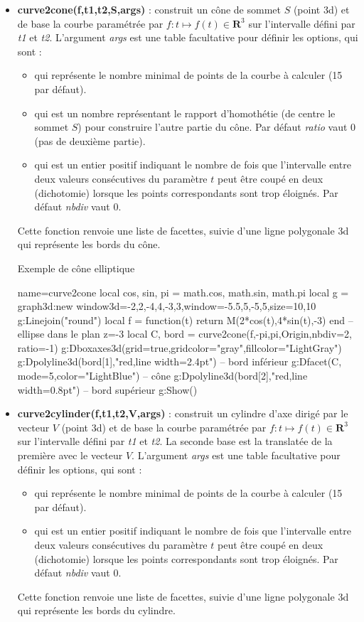 \begin{itemize}
    \item \textbf{curve2cone(f,t1,t2,S,args)} : construit un cône de sommet $S$ (point 3d) et de base la courbe paramétrée par $f\colon t\mapsto f(t)\in\mathbf R^3$ sur l'intervalle défini par \emph{t1} et \emph{t2}. L'argument \emph{args} est une table facultative pour définir les options, qui sont :
    \begin{itemize}
        \item {} qui représente le nombre minimal de points de la courbe à calculer (15 par défaut).
        \item {} qui est un nombre représentant le rapport d'homothétie (de centre le sommet $S$) pour construire l'autre partie du cône. Par défaut \emph{ratio} vaut 0 (pas de deuxième partie).
        \item {} qui est un entier positif indiquant le nombre de fois que l'intervalle entre deux valeurs consécutives du paramètre $t$ peut être coupé en deux (dichotomie) lorsque les points correspondants sont trop éloignés. Par défaut \emph{nbdiv} vaut 0.
    \end{itemize}
 Cette fonction renvoie une liste de facettes, suivie d'une ligne polygonale 3d qui représente les bords du cône.
 
\begin{demo}{Exemple de cône elliptique}
\begin{luadraw}{name=curve2cone}
local cos, sin, pi = math.cos, math.sin, math.pi
local g = graph3d:new{ window3d={-2,2,-4,4,-3,3},window={-5.5,5,-5,5},size={10,10}}
g:Linejoin("round")
local f = function(t) return M(2*cos(t),4*sin(t),-3) end -- ellipse dans le plan z=-3
local C, bord = curve2cone(f,-pi,pi,Origin,{nbdiv=2, ratio=-1})
g:Dboxaxes3d({grid=true,gridcolor="gray",fillcolor="LightGray"})
g:Dpolyline3d(bord[1],"red,line width=2.4pt") -- bord inférieur
g:Dfacet(C, {mode=5,color="LightBlue"})  -- cône
g:Dpolyline3d(bord[2],"red,line width=0.8pt") -- bord supérieur
g:Show()
\end{luadraw}
\end{demo}

    \item \textbf{curve2cylinder(f,t1,t2,V,args)} : construit un cylindre d'axe dirigé par le vecteur $V$ (point 3d) et de base la courbe paramétrée par $f\colon t\mapsto f(t)\in\mathbf R^3$ sur l'intervalle défini par \emph{t1} et \emph{t2}. La seconde base est la translatée de la première avec le vecteur $V$. L'argument \emph{args} est une table facultative pour définir les options, qui sont :
    \begin{itemize}
        \item {} qui représente le nombre minimal de points de la courbe à calculer (15 par défaut).
        \item {} qui est un entier positif indiquant le nombre de fois que l'intervalle entre deux valeurs consécutives du paramètre $t$ peut être coupé en deux (dichotomie) lorsque les points correspondants sont trop éloignés. Par défaut \emph{nbdiv} vaut 0.
    \end{itemize}
 Cette fonction renvoie une liste de facettes, suivie d'une ligne polygonale 3d qui représente les bords du cylindre.
 

\end{itemize}
